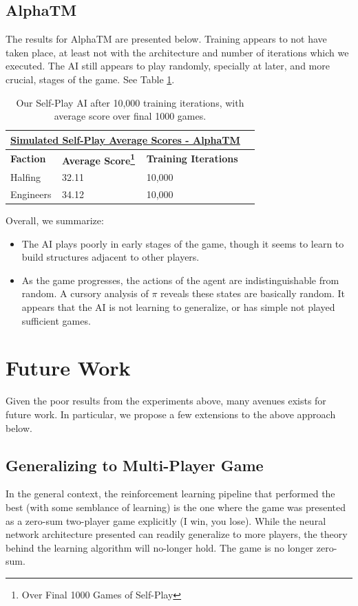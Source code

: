 \documentclass[10pt,twocolumn,letterpaper]{article}
\begin{document}
\subsection{AlphaTM}
The results for AlphaTM are presented below. Training appears to not have taken place, at least not with the architecture and number of iterations which we executed. The AI still appears to play randomly, specially at later, and more crucial, stages of the game. See Table \ref{table:average_2p_score_alpha_tm}.


\begin{table}[!ht]
\begin{tabular}{|l|l|l|l|}
\hline
\multicolumn{3}{|c|}{{\ul \textbf{Simulated Self-Play Average Scores - AlphaTM}}}      \\ \hline
\textbf{Faction} & \textbf{Average Score\footnote{Over Final 1000 Games of Self-Play}} & \textbf{Training Iterations} \\ \hline
Halfing          & 32.11                 & 10,000                   \\ \hline
Engineers        & 34.12                 & 10,000                 \\ \hline
\end{tabular}
\caption{Our Self-Play AI after 10,000 training iterations, with average score over final 1000 games.}
\label{table:average_2p_score_alpha_tm}
\end{table}

Overall, we summarize:
\begin{itemize}
    \item The AI plays poorly in early stages of the game, though it seems to learn to build structures adjacent to other players.
    \item As the game progresses, the actions of the agent are indistinguishable from random. A cursory analysis of $\pi$ reveals these states are basically random. It appears that the AI is not learning to generalize, or has simple not played sufficient games.
\end{itemize}

\section{Future Work}
Given the poor results from the experiments above, many avenues exists for future work. In particular, we propose a few extensions to the above approach below.

\subsection{Generalizing to Multi-Player Game}
In the general context, the reinforcement learning pipeline that performed the best (with some semblance of learning) is the one where the game was presented as a zero-sum two-player game explicitly (I win, you lose). While the neural network architecture presented can readily generalize to more players, the theory behind the learning algorithm will no-longer hold. The game is no longer zero-sum.
\end{document}
